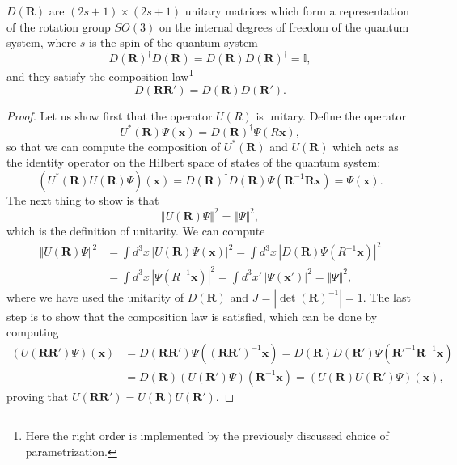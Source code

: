 \begin{example}
    \(D(\mathbf{R})\) are \((2s+1)\times(2s+1)\) unitary matrices which form a representation of the rotation group \(SO(3)\) on the internal degrees of freedom of the quantum system, where \(s\) is the spin of the quantum system
    \[
        D(\mathbf{R})^{\dagger}D(\mathbf{R}) = D(\mathbf{R}) D(\mathbf{R})^{\dagger} = \mathbb{I},
    \]
    and they satisfy the composition law\footnote{Here the right order is implemented by the previously discussed choice of parametrization.}
    \[
        D(\mathbf{R} \mathbf{R}') = D(\mathbf{R}) D(\mathbf{R}').
    \]
    \begin{proof}
        Let us show first that the operator \(U(R)\) is unitary. Define the operator
        \[
            U^*(\mathbf{R})\Psi(\mathbf{x}) = D(\mathbf{R})^\dagger \Psi(R\mathbf{x}),
        \]
        so that we can compute the composition of \(U^*(\mathbf{R})\) and \(U(\mathbf{R})\) which acts as the identity operator on the Hilbert space of states of the quantum system:
        \[
            (U^*(\mathbf{R}) U(\mathbf{R})\Psi)(\mathbf{x}) = D(\mathbf{R})^\dagger D(\mathbf{R}) \Psi(\mathbf{R}^{-1}\mathbf{R}\mathbf{x}) = \Psi(\mathbf{x}).
        \]
        The next thing to show is that
        \[
            \Vert U(\mathbf{R})\Psi \Vert^2 = \Vert \Psi \Vert^2,
        \]
        which is the definition of unitarity. We can compute
        \[
            \begin{aligned}
                \Vert U(\mathbf{R})\Psi \Vert^2 & = \int d^3x \, |U(\mathbf{R})\Psi(\mathbf{x})|^2 = \int d^3x \, |D(\mathbf{R})\Psi(R^{-1}\mathbf{x})|^2 \\
                                                & = \int d^3x \, |\Psi(R^{-1}\mathbf{x})|^2 = \int d^3x' \, |\Psi(\mathbf{x}')|^2 = \Vert \Psi \Vert^2,
            \end{aligned}
        \]
        where we have used the unitarity of \(D(\mathbf{R})\) and \(J = |\det(\mathbf{R})^{-1}| = 1\). The last step is to show that the composition law is satisfied, which can be done by computing
        \[
            \begin{aligned}
                (U(\mathbf{R} \mathbf{R}')\Psi)(\mathbf{x}) & = D(\mathbf{R} \mathbf{R}')\Psi((\mathbf{R} \mathbf{R}')^{-1}\mathbf{x}) = D(\mathbf{R}) D(\mathbf{R}')\Psi(\mathbf{R}'^{-1} \mathbf{R}^{-1}\mathbf{x}) \\
                                                            & = D(\mathbf{R}) (U(\mathbf{R}')\Psi)(\mathbf{R}^{-1}\mathbf{x}) = (U(\mathbf{R}) U(\mathbf{R}')\Psi)(\mathbf{x}),
            \end{aligned}
        \]
        proving that \(U(\mathbf{R} \mathbf{R}') = U(\mathbf{R}) U(\mathbf{R}')\).
    \end{proof}


\end{example}
